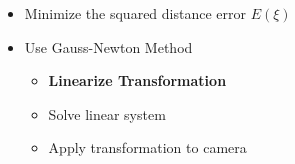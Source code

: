 \documentclass{beamer}
\begin{document}
{\begin{columns}
\begin{itemize}
                            \item Minimize the squared distance error $E(\xi)$
                            \item Use Gauss-Newton Method
                            \begin{itemize}
                                  \item {\textbf{Linearize Transformation}}
                                  \item Solve linear system
                                  \item Apply transformation to camera
                            \end{itemize}
                \end{itemize}
        \end{columns}
}
\end{document}
